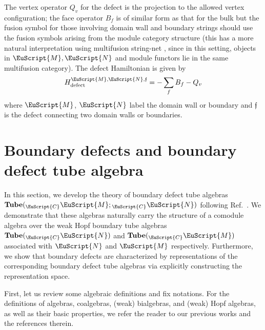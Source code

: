 \documentclass[a4paper,11pt]{article}
\theoremstyle{definition}
\theoremstyle{remark}
\newcommand\eC           {\EuScript{C}}
\newcommand\eM          {\EuScript{M}}
\newcommand\eN         {\EuScript{N}}
\begin{document}
The vertex operator $Q_v$ for the defect is the projection to the allowed vertex configuration; the face operator $B_f$ is of similar form as that for the bulk but the fusion symbol for those involving domain wall and boundary strings should use the fusion symbols arising from the module category structure (this has a more natural interpretation using multifusion string-net \cite{jia2024weakTube}, since in this setting, objects in $\eM,\eN$ and module functors lie in the same multifusion category). The defect Hamiltonian is given by
\begin{equation}
    H_{\rm defect}^{\eM,\eN,\mathfrak{f}}=-\sum_f B_f -Q_{v}
\end{equation}
where $\eM$, $\eN$ label the domain wall or boundary and $\mathfrak{f}$ is the defect connecting two domain walls or boundaries.



\section{Boundary defects and boundary defect tube algebra}
\label{Sec:BoundaryTube}

In this section, we develop the theory of boundary defect tube algebras \(\mathbf{Tube}({_\eC}\eM;{_\eC}\eN)\) following Ref.~\cite{Kitaev2012boundary}. We demonstrate that these algebras naturally carry the structure of a comodule algebra over the weak Hopf boundary tube algebras \(\mathbf{Tube}({_\eC}\eN)\) and \(\mathbf{Tube}({_\eC}\eM)\) associated with \(\eN\) and \(\eM\) respectively. Furthermore, we show that boundary defects are characterized by representations of the corresponding boundary defect tube algebras via explicitly constructing the representation space.

First, let us review some algebraic definitions and fix notations. For the definitions of algebras, coalgebras, (weak) bialgebras, and (weak) Hopf algebras, as well as their basic properties, we refer the reader to our previous works \cite{jia2024weakTube, jia2025tube} and the references therein. 
\end{document}
